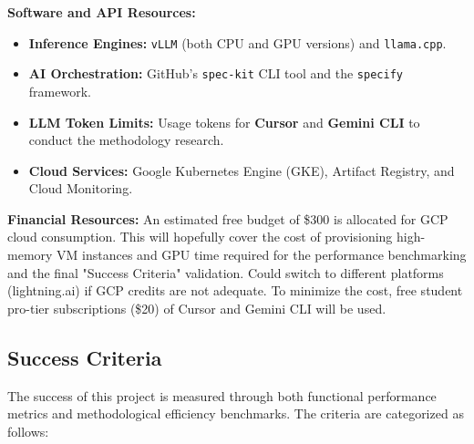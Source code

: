 \documentclass[a4paper,12pt]{report}
\begin{document}
\textbf{Software and API Resources:}
\begin{itemize}
    \item \textbf{Inference Engines:} \texttt{vLLM} (both CPU and GPU versions) and \texttt{llama.cpp}.
    \item \textbf{AI Orchestration:} GitHub's \texttt{spec-kit} CLI tool and the \texttt{specify} framework.
    \item \textbf{LLM Token Limits:} Usage tokens for \textbf{Cursor} and \textbf{Gemini CLI} to conduct the methodology research.
    \item \textbf{Cloud Services:} Google Kubernetes Engine (GKE), Artifact Registry, and Cloud Monitoring.
\end{itemize}

\textbf{Financial Resources:}
An estimated free budget of \$300 is allocated for GCP cloud consumption. This will hopefully cover the cost of provisioning high-memory VM instances and GPU time required for the performance benchmarking and the final "Success Criteria" validation. Could switch to different platforms (lightning.ai) if GCP credits are not adequate. To minimize the cost, free student pro-tier subscriptions (\$20) of Cursor and Gemini CLI will be used.  

\subsection{Success Criteria}
The success of this project is measured through both functional performance metrics and methodological efficiency benchmarks. The criteria are categorized as follows:
\end{document}
